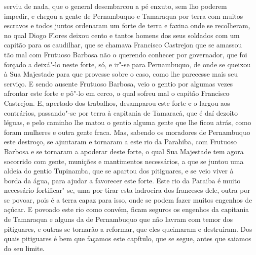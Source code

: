 serviu de nada, que o general desembarcou a pé enxuto, sem lho poderem impedir, e chegou a
gente de Pernambuquo e Tamaraqua por terra com muitos escravos e todos juntos ordenaram um
forte de terra e faxina onde se recolheram, no qual Diogo Flores deixou cento e tantos
homens dos seus soldados com um capitão para os caudilhar, que se chamava Francisco
Castrejon que se amassou tão mal com Frutuoso Barbosa não o querendo conhecer por
governador, que foi forçado a deixá"-lo neste forte, só, e ir"-se para Pernambuquo, de onde
se queixou à Sua Majestade para que provesse sobre o caso, como lhe parecesse mais seu
serviço. E sendo ausente Frutuoso Barbosa, veio o gentio por algumas vezes afrontar este
forte e pô"-lo em cerco, o qual sofreu mal o capitão Francisco Castrejon. E, apertado dos
trabalhos, desamparou este forte e o largou aos contrários, passando"-se por terra à
capitania de Tamaracá, que é daí dezoito léguas, e pelo caminho lhe matou o gentio alguma
gente que lhe ficou atrás, como foram mulheres e outra gente fraca. Mas, sabendo os
moradores de Pernambuquo este destroço, se ajuntaram e tornaram a este rio da Parahiba,
com Frutuoso Barbosa e se tornaram a apoderar deste forte, o qual Sua Majestade tem agora
socorrido com gente, munições e mantimentos necessários, a que se juntou uma aldeia do
gentio Tupinamba, que se apartou dos pitiguares, e se veio viver à borda da água, para
ajudar a favorecer este forte. Este rio da Paraiba é muito necessário fortificar"-se, uma
por tirar esta ladroeira dos franceses dele, outra por se povoar, pois é a terra capaz
para isso, onde se podem fazer muitos engenhos de açúcar. E povoado este rio como convém,
ficam seguros os engenhos da capitania de Tamaraqua e alguns da de Pernambuquo que não
lavram com temor dos pitiguares, e outras se tornarão a reformar, que eles queimaram e
destruíram. Dos quais pitiguares é bem que façamos este capítulo, que se segue, antes que
saiamos do seu limite.

